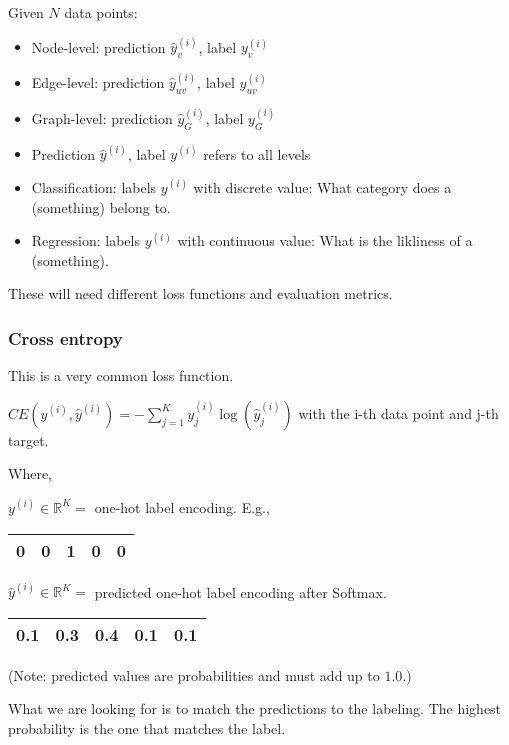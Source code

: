 \documentclass{article}
\begin{document}
Given $N$ data points:

\begin{itemize}
    \item Node-level: prediction $\hat{y}_v^{(i)}$, label $y_v^{(i)}$
    \item Edge-level: prediction $\hat{y}_{uv}^{(i)}$, label $y_{uv}^{(i)}$
    \item Graph-level: prediction $\hat{y}_G^{(i)}$, label $y_G^{(i)}$
    \item Prediction $\hat{y}^{(i)}$, label $y^{(i)}$ refers to all levels
\end{itemize}

\begin{itemize}
    \item Classification: labels $y^{(i)}$ with discrete value: What category does a (something) belong to.
    \item Regression: labels $y^{(i)}$ with continuous value: What is the likliness of a (something).
\end{itemize}

These will need different loss functions and evaluation metrics.

\subsubsection{Cross entropy}

This is a very common loss function.

$CE(y^{(i)}, \hat{y}^{(i)}) = -\sum_{j=1}^K y_j^{(i)} \log(\hat{y}_j^{(i)})$ with the i-th data point and j-th target.

Where,

$y^{(i)} \in \mathbb{R}^K =$ one-hot label encoding. E.g.,

\begin{tabular}{|c|c|c|c|c|}
    \hline
    0 & 0 & 1 & 0 & 0 \\
    \hline    
\end{tabular}

$\hat{y}^{(i)} \in \mathbb{R}^K =$ predicted one-hot label encoding after Softmax.

\begin{tabular}{|c|c|c|c|c|}
    \hline
    0.1 & 0.3 & 0.4 & 0.1 & 0.1 \\
    \hline    
\end{tabular}

(Note: predicted values are probabilities and must add up to $1.0$.)

What we are looking for is to match the predictions to the labeling. The highest probability is the one that matches the label.
\end{document}
